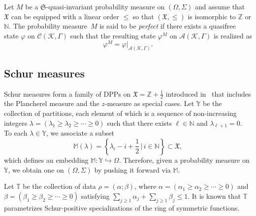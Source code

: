 \documentclass[pdftex]{sigma}
\numberwithin{equation}{section}
\newcommand{\mfrak}[1]{\mathfrak{#1}}
\newcommand{\mcal}[1]{\mathcal{#1}}
\newcommand{\mbb}[1]{\mathbb{#1}}
\begin{document}
\begin{Definition}
Let $M$ be a $\mfrak{S}$-quasi-invariant probability measure on $(\Omega,\Sigma)$ and assume that~$\mfrak{X}$ can be equipped with a linear order $\le$ so that $(\mfrak{X},\le)$ is isomorphic to $\mbb{Z}$ or $\mbb{N}$. The probability measure~$M$ is said to be {\it perfect} if there exists a quasifree state $\varphi$ on $\mcal{C}(\mcal{K},\Gamma)$ such that the resulting state $\varphi^{M}$ on $\mcal{A}(\mcal{K},\Gamma)$ is realized as
\begin{equation*}
	\varphi^{M}=\varphi|_{\mcal{A}(\mcal{K},\Gamma)}.
\end{equation*}
\end{Definition}

\subsection{Schur measures} Schur measures form a family of DPPs on $\mfrak{X}=\mbb{Z}+\frac{1}{2}$ introduced in~\cite{Okounkov2001} that includes the Plancherel measure and the $z$-measure as special cases.
Let $\mbb{Y}$ be the collection of partitions, each element of which is a sequence of non-increasing integers $\lambda=(\lambda_{1}\ge \lambda_{2}\ge \cdots \ge 0)$ such that there exists $\ell\in\mbb{N}$ and $\lambda_{\ell+1}=0$. To each $\lambda\in\mbb{Y}$, we associate a subset
\begin{equation*}
	\mbb{M}(\lambda)=\left\{\lambda_{i}-i+\frac{1}{2}\,\bigg|\,i\in\mbb{N}\right\}\subset\mfrak{X},
\end{equation*}
which defines an embedding $\mbb{M}\colon \mbb{Y}\hookrightarrow \Omega$. Therefore, given a probability measure on $\mbb{Y}$, we obtain one on $(\Omega,\Sigma)$ by pushing it forward via $\mbb{M}$.

Let $\mbb{T}$ be the collection of data $\rho=(\alpha;\beta)$, where $\alpha=(\alpha_{1}\ge \alpha_{2}\ge\cdots \ge 0)$ and $\beta=(\beta_{1}\ge \beta_{2}\ge \cdots \ge 0)$ satisfying $\sum_{j\ge 1}\alpha_{j}+\sum_{j\ge 1}\beta_{j}\le 1$.
It is known that $\mbb{T}$ parametrizes Schur-positive specializations of the ring of symmetric functions.
\end{document}
